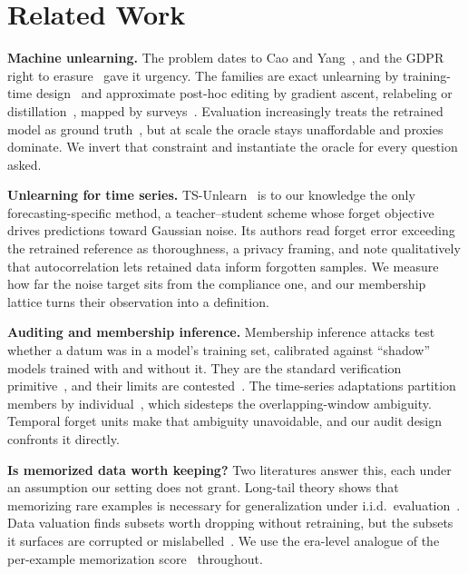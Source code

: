 \section{Related Work}\label{sec:related}

\textbf{Machine unlearning.} The problem dates to Cao and
Yang~\cite{cao2015towards}, and the GDPR right to
erasure~\cite{gdpr2016} gave it urgency. The families are exact
unlearning by training-time design~\cite{bourtoule2021sisa} and
approximate post-hoc editing by gradient ascent, relabeling or
distillation~\cite{kurmanji2023scrub}, mapped by
surveys~\cite{nguyen2025survey}.
Evaluation increasingly treats the retrained model as ground
truth~\cite{shi2024muse}, but at scale the oracle
stays unaffordable and proxies dominate. We invert that constraint
and instantiate the oracle for every question asked.

\textbf{Unlearning for time series.}
TS-Unlearn~\cite{wang2026tsunlearn} is to our knowledge the only
forecasting-specific method, a teacher--student scheme whose forget
objective drives predictions toward Gaussian noise. Its authors
read forget error exceeding the retrained reference as
thoroughness, a privacy framing, and note qualitatively that
autocorrelation lets retained data inform forgotten samples. We
measure how far the noise target sits from the compliance one, and
our membership lattice turns their observation into a definition.

\textbf{Auditing and membership inference.} Membership inference
attacks test whether a datum was in a model's training set,
calibrated against ``shadow'' models trained with and without it.
They are the standard verification
primitive~\cite{carlini2022lira}, and their limits are
contested~\cite{zhang2024mia_cannot}. The time-series
adaptations partition members by
individual~\cite{johansson2026privacy}, which sidesteps the
overlapping-window ambiguity. Temporal forget units make that
ambiguity unavoidable, and our audit design confronts it directly.

\textbf{Is memorized data worth keeping?} Two literatures answer
this, each under an assumption our setting does not grant.
Long-tail theory shows that memorizing rare examples is necessary
for generalization under i.i.d.\
evaluation~\cite{feldman2020memorization}. Data valuation finds
subsets worth dropping without retraining, but the subsets it
surfaces are corrupted or
mislabelled~\cite{ghorbani2019datashapley}. We use the era-level
analogue of the per-example memorization
score~\cite{feldman2020what} throughout.

